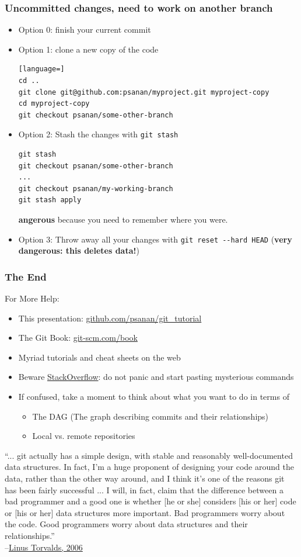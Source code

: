 \documentclass{beamer}
\begin{document}
\begin{frame}[fragile]
\frametitle{Uncommitted changes, need to work on another branch}
\begin{itemize}
\item Option 0: finish your current commit
\item Option 1: clone a new copy of the code
\begin{lstlisting}[language=]
cd ..
git clone git@github.com:psanan/myproject.git myproject-copy
cd myproject-copy
git checkout psanan/some-other-branch
\end{lstlisting}
\item Option 2: Stash the changes with \lstinline{git stash}
\begin{lstlisting}
git stash
git checkout psanan/some-other-branch
...
git checkout psanan/my-working-branch
git stash apply
\end{lstlisting}
\textbf{angerous} because you need to remember where you were.
\item Option 3: Throw away all your changes with \lstinline{git reset --hard HEAD} (\textbf{very dangerous: this deletes data!})
\end{itemize}
\end{frame}

\begin{frame}[fragile]
\frametitle{The End}

For More Help:
\begin{itemize}
\item This presentation: \href{https://github.com/psanan/git_tutorial}{github.com/psanan/git\_tutorial}
\item
The Git Book: \href{https://git-scm.com/book}{git-scm.com/book}
\item
Myriad tutorials and cheat sheets on the web
\item
  Beware \href{https://www.stackoverflow.com}{StackOverflow}: do not panic and start pasting mysterious commands
\item If confused, take a moment to think about what you want to do in terms of
  \begin{itemize}
    \item The DAG (The graph describing commits and their relationships)
    \item Local vs. remote repositories
  \end{itemize}
\end{itemize}
\vspace{30px}
{\tiny ``... git actually has a simple design, with stable and reasonably well-documented data structures.
In fact, I'm a huge proponent of designing your code around the data, rather than the other
way around, and I think it's one of the reasons git has been fairly successful ... I will, in
fact, claim that the difference between a bad programmer and a good one is whether [he or she]
considers [his or her] code or [his or her] data structures more important. Bad programmers worry
about the code. Good programmers worry about data structures and their relationships.''\\
--\href{http://lwn.net/Articles/193245/}{Linus Torvalds, 2006}
}
\end{frame}
\end{document}
